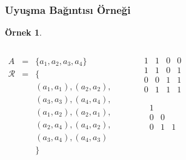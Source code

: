\documentclass[dvipsnames]{beamer}
\theoremstyle{definition}
\theoremstyle{example}
\newtheorem{ornek}[theorem]{Örnek}
\theoremstyle{plain}
\begin{document}
\begin{frame}
  \frametitle{Uyuşma Bağıntısı Örneği}

  \begin{ornek}
    \begin{columns}
      \begin{eqnarray*}
        A           & = & \{a_1,a_2,a_3,a_4\}\\
        \mathcal{R} & = & \{\\
                    &   & (a_1,a_1),(a_2,a_2),\\
                    &   & (a_3,a_3),(a_4,a_4),\\
                    &   & (a_1,a_2),(a_2,a_1),\\
                    &   & (a_2,a_4),(a_4,a_2),\\
                    &   & (a_3,a_4),(a_4,a_3)\\
                    &   & \}
      \end{eqnarray*}

      \begin{center}

        \bigskip
      \end{center}

      \pause
      \begin{center}
        \[
          \begin{array}{|cccc|}
            1  &  1  &  0  &  0\\
            1  &  1  &  0  &  1\\
            0  &  0  &  1  &  1\\
            0  &  1  &  1  &  1
          \end{array}
        \]

        \[
          \begin{array}{|ccc|}
            1  &     & \\
            0  &  0  & \\
            0  &  1  &  1
          \end{array}
        \]
      \end{center}
    \end{columns}
  \end{ornek}
\end{frame}
\end{document}
